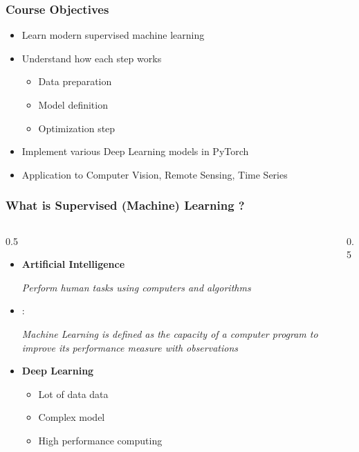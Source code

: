 \documentclass[pressentation,10pt,aspectratio=169,xcolor=table, colorlinks=true]{beamer}
\begin{document}
\begin{frame}
  \frametitle{Course Objectives}
  \begin{itemize}
  \item Learn modern supervised machine learning 
  \item Understand how each step works
    \begin{itemize}
    \item Data preparation
    \item Model definition
    \item Optimization step
    \end{itemize}
  \item Implement various Deep Learning models in PyTorch
  \item Application to Computer Vision, Remote Sensing, Time Series
  \end{itemize}
\end{frame}

\begin{frame}
  \frametitle{What is Supervised (Machine) Learning ?}
  \begin{columns}[c]
    \begin{column}{0.5\linewidth}
      \begin{itemize}
      \item <1-> \textbf{Artificial Intelligence} %
        \centerline{\em Perform human tasks using computers and algorithms} %
      \item <2-> \cite{mitchelllearning}:
        \begin{center}
          \emph{Machine Learning is defined as the capacity of a computer program to improve its performance measure with observations}
        \end{center}
      \item <3-> \textbf{Deep Learning}
        \begin{itemize}
        \item Lot of data data
        \item Complex model
        \item High performance computing
        \end{itemize}
      \end{itemize}
    \end{column}

    \begin{column}{0.5\linewidth}
      \begin{center}
      \end{center}
    \end{column}
  \end{columns}
\end{frame}
\end{document}
